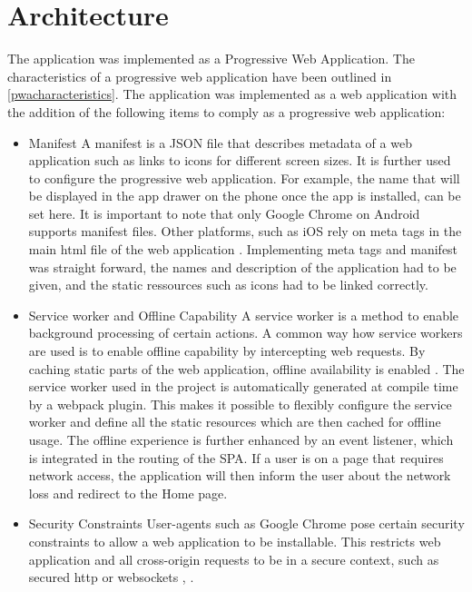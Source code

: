 \section{Architecture\label{architecture}}
The application was implemented as a Progressive Web Application. The characteristics of a progressive web application have been outlined in \ref{pwacharacteristics}. The application was implemented as a web application with the addition of the following items to comply as a progressive web application:
\begin{itemize}
\item Manifest
A manifest is a JSON file that describes metadata of a web application such as links to icons for different screen sizes. It is further used to configure the progressive web application. For example, the name that will be displayed in the app drawer on the phone once the app is installed, can be set here. It is important to note that only Google Chrome on Android supports manifest files. \cite{manifest} Other platforms, such as iOS rely on meta tags in the main html file of the web application \cite{applemetatags}. Implementing meta tags and manifest was straight forward, the names and description of the application had to be given, and the static ressources such as icons had to be linked correctly.
\item Service worker and Offline Capability
A service worker is a method to enable background processing of certain actions. A common way how service workers are used is to enable offline capability by intercepting web requests. By caching static parts of the web application, offline availability is enabled \cite{serviceworkers}. The service worker used in the project is automatically generated at compile time by a webpack plugin. This makes it possible to flexibly configure the service worker and define all the static resources which are then cached for offline usage. The offline experience is further enhanced by an event listener, which is integrated in the routing of the SPA. If a user is on a page that requires network access, the application will then inform the user about the network loss and redirect to the Home page.

\item Security Constraints
User-agents such as Google Chrome pose certain security constraints to allow a web application to be installable. This restricts web application and all cross-origin requests to be in a secure context, such as secured http or websockets \cite{manifest}, \cite{securitychrome}.
\end{itemize}

